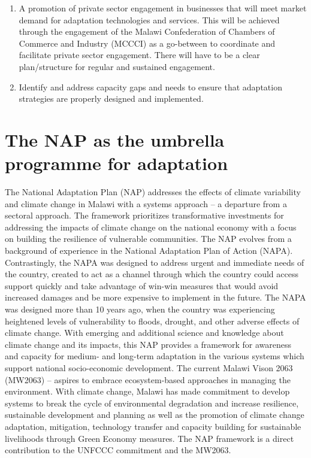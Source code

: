 \documentclass[
]{book}
\begin{document}
\begin{enumerate}
\item
  A promotion of private sector engagement in businesses that will meet market demand for adaptation technologies and services. This will be achieved through the engagement of the Malawi Confederation of Chambers of Commerce and Industry (MCCCI) as a go-between to coordinate and facilitate private sector engagement. There will have to be a clear plan/structure for regular and sustained engagement.
\item
  Identify and address capacity gaps and needs to ensure that adaptation strategies are properly designed and implemented.
\end{enumerate}

\hypertarget{the-nap-as-the-umbrella-programme-for-adaptation}{%
\section{The NAP as the umbrella programme for adaptation}\label{the-nap-as-the-umbrella-programme-for-adaptation}}

The National Adaptation Plan (NAP) addresses the effects of climate variability and climate change in Malawi with a systems approach -- a departure from a sectoral approach. The framework prioritizes transformative investments for addressing the impacts of climate change on the national economy with a focus on building the resilience of vulnerable communities. The NAP evolves from a background of experience in the National Adaptation Plan of Action (NAPA). Contrastingly, the NAPA was designed to address urgent and immediate needs of the country, created to act as a channel through which the country could access support quickly and take advantage of win-win measures that would avoid increased damages and be more expensive to implement in the future. The NAPA was designed more than 10 years ago, when the country was experiencing heightened levels of vulnerability to floods, drought, and other adverse effects of climate change. With emerging and additional science and knowledge about climate change and its impacts, this NAP provides a framework for awareness and capacity for medium- and long-term adaptation in the various systems which support national socio-economic development. The current Malawi Vison 2063 (MW2063) -- aspires to embrace ecosystem-based approaches in managing the environment. With climate change, Malawi has made commitment to develop systems to break the cycle of environmental degradation and increase resilience, sustainable development and planning as well as the promotion of climate change adaptation, mitigation, technology transfer and capacity building for sustainable livelihoods through Green Economy measures. The NAP framework is a direct contribution to the UNFCCC commitment and the MW2063.
\end{document}
